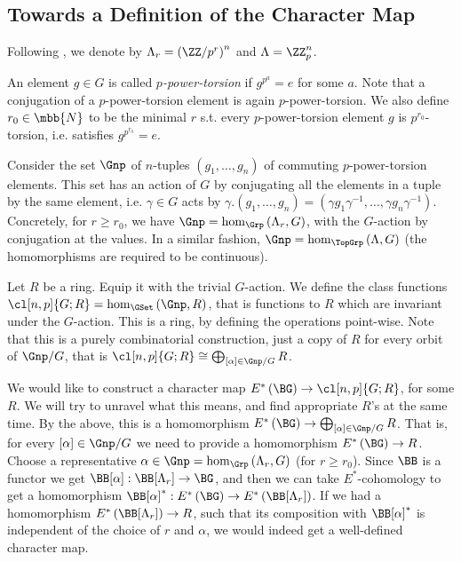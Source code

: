 


\subsection{Towards a Definition of the Character Map}\label{towards-character}

Following \cite{HKR}, we denote by $\Lambda_r = \left(\ZZ/{p^r}\right)^n$ and $\Lambda = \ZZ_p^n$.

An element $g \in G$ is called \emph{$p$-power-torsion} if $g^{p^a} = e$ for some $a$.
Note that a conjugation of a $p$-power-torsion element is again $p$-power-torsion.
We also define $r_0 \in \mbb{N}$ to be the minimal $r$ s.t. every $p$-power-torsion element $g$ is $p^{r_0}$-torsion, i.e. satisfies $g^{p^{r_0}} = e$.

Consider the set $\Gnp$ of $n$-tuples $\left(g_1, \dotsc, g_n\right)$ of commuting $p$-power-torsion elements.
This set has an action of $G$ by conjugating all the elements in a tuple by the same element, i.e. $\gamma \in G$ acts by $\gamma. \left(g_1, \dotsc, g_n\right) = \left(\gamma g_1 \gamma^{-1}, \dotsc, \gamma g_n \gamma^{-1}\right)$.
Concretely, for $r \geq r_0$, we have $\Gnp = \hom_{\Grp}\left(\Lambda_r, G\right)$, with the $G$-action by conjugation at the values.
In a similar fashion, $\Gnp = \hom_{\TopGrp}\left(\Lambda, G\right)$ (the homomorphisms are required to be continuous).

Let $R$ be a ring.
Equip it with the trivial $G$-action.
We define the class functions $\cl[n,p]{G; R} = \hom_{\GSet}\left(\Gnp, R\right)$, that is functions to $R$ which are invariant under the $G$-action.
This is a ring, by defining the operations point-wise.
Note that this is a purely combinatorial construction, just a copy of $R$ for every orbit of $\Gnp/G$, that is $\cl[n,p]{G; R} \cong \bigoplus_{\left[\alpha\right] \in \Gnp/G} R$.

We would like to construct a character map $E^*\left(\BG\right) \to \cl[n,p]{G; R}$, for some $R$.
We will try to unravel what this means, and find appropriate $R$'s at the same time.
By the above, this is a homomorphism $E^*\left(\BG\right) \to \bigoplus_{\left[\alpha\right] \in \Gnp/G} R$.
That is, for every $\left[\alpha\right] \in \Gnp/G$ we need to provide a homomorphism $E^*\left(\BG\right) \to R$.
Choose a representative $\alpha \in \Gnp = \hom_{\Grp}\left(\Lambda_r, G\right)$ (for $r \geq r_0$).
Since $\BB$ is a functor we get $\BB[\alpha]: \BB[\Lambda_r] \to \BG$, and then we can take $E^*$-cohomology to get a homomorphism $\BB[\alpha]^*: E^*\left(\BG\right) \to E^*\left(\BB[\Lambda_r]\right)$.
If we had a homomorphism $E^*\left(\BB[\Lambda_r]\right) \to R$, such that its composition with $\BB[\alpha]^*$ is independent of the choice of $r$ and $\alpha$, we would indeed get a well-defined character map.



